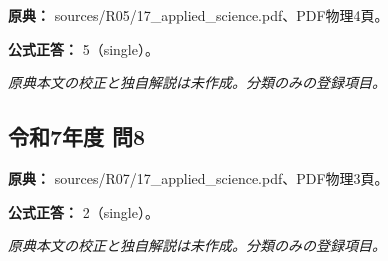 \noindent\textbf{原典：} sources/R05/17\_applied\_science.pdf、PDF物理4頁。

\textbf{公式正答：} 5（single）。

\par\textit{原典本文の校正と独自解説は未作成。分類のみの登録項目。}

\subsection{令和7年度 問8}
\label{q:r07-reg-applied-08}

\noindent\textbf{原典：} sources/R07/17\_applied\_science.pdf、PDF物理3頁。

\textbf{公式正答：} 2（single）。

\par\textit{原典本文の校正と独自解説は未作成。分類のみの登録項目。}
